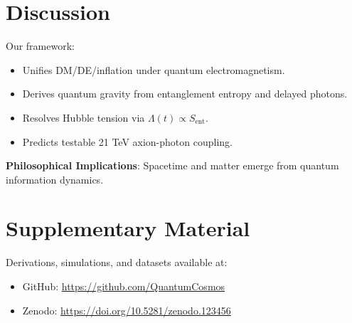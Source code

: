 \documentclass[12pt, a4paper]{article}
\begin{document}
\section{Discussion}
\label{sec:discussion}
Our framework:
\begin{itemize}
\item Unifies DM/DE/inflation under quantum electromagnetism.
\item Derives quantum gravity from entanglement entropy and delayed photons.
\item Resolves Hubble tension via \( \Lambda(t) \propto S_{\text{ent}} \).
\item Predicts testable 21 TeV axion-photon coupling.
\end{itemize}
\textbf{Philosophical Implications}: Spacetime and matter emerge from quantum information dynamics.

\section*{Supplementary Material}
Derivations, simulations, and datasets available at:
\begin{itemize}
\item GitHub: \url{https://github.com/QuantumCosmos}
\item Zenodo: \url{https://doi.org/10.5281/zenodo.123456}
\end{itemize}



\end{document}
